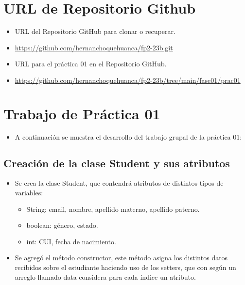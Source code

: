 \documentclass{article}
\begin{document}
	\section{URL de Repositorio Github}
	\begin{itemize}
		\item URL del Repositorio GitHub para clonar o recuperar.
		\item \url{https://github.com/hernanchoquehuanca/fp2-23b.git}
		\item URL para el práctica 01 en el Repositorio GitHub.
		\item \url{https://github.com/hernanchoquehuanca/fp2-23b/tree/main/fase01/prac01}
	\end{itemize}

	\section{Trabajo de Práctica 01}
	
	\begin{itemize}	
		\item A continuación se muestra el desarrollo del trabajo grupal de la práctica 01:
	\end{itemize}


    \subsection{Creación de la clase Student y sus atributos}

	\begin{itemize}	
		\item Se crea la clase Student, que contendrá atributos de distintos tipos de variables:
        \begin{itemize}
            \item String: email, nombre, apellido materno, apellido paterno.
            \item boolean: género, estado.
            \item int: CUI, fecha de nacimiento.
        \end{itemize}
	\end{itemize}

	
 
    \begin{itemize}	
		\item Se agregó el método constructor, este método asigna los distintos datos recibidos sobre el estudiante haciendo uso de los setters, que con según un arreglo llamado data considera para cada índice un atributo.
	\end{itemize}
\end{document}
